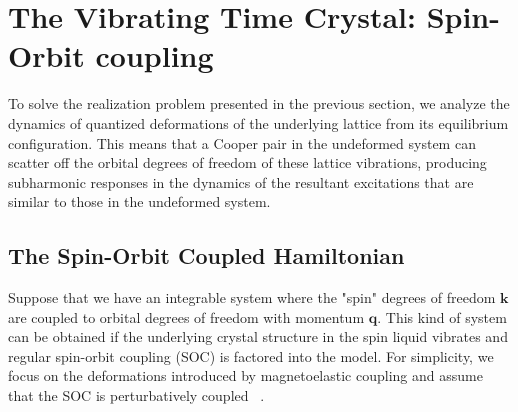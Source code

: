 \documentclass[preprint,5p,times,twocolumn]{elsarticle}
\newcommand{\bmk}{\bm{k}}
\begin{document}
\section{The Vibrating Time Crystal: Spin-Orbit coupling}
\label{sec:soc}
To solve the realization problem presented in the previous section, we analyze the dynamics of quantized deformations of the underlying lattice from its equilibrium configuration. This means that a Cooper pair in the undeformed system can scatter off the orbital degrees of freedom of these lattice vibrations, producing subharmonic responses in the dynamics of the resultant excitations that are similar to those in the undeformed system.

\subsection{The Spin-Orbit Coupled Hamiltonian}
Suppose that we have an integrable system where the "spin" degrees of freedom $\bmk$ are coupled to orbital degrees of freedom with momentum $\bm{q}$. This kind of system can be obtained if the underlying crystal structure in the spin liquid vibrates and regular spin-orbit coupling (SOC) is factored into the model. For simplicity, we focus on the deformations introduced by magnetoelastic coupling and assume that the SOC is perturbatively coupled ~\citep{soc:dixon,fiete:phonons,soc:phonons}. 
\end{document}
